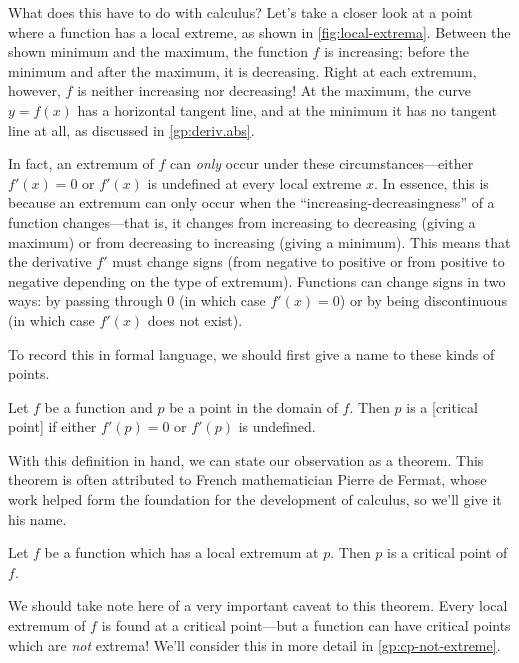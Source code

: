 \documentclass[../book/calcnotes.tex]{subfiles}
\begin{document}
What does this have to do with calculus?
Let's take a closer look at a point where a function has a local extreme, as shown in \cref{fig:local-extrema}.
Between the shown minimum and the maximum, the function $f$ is increasing; before the minimum and after the maximum, it is decreasing.
Right at each extremum, however, $f$ is neither increasing nor decreasing!
At the maximum, the curve $y = f(x)$ has a horizontal tangent line, and at the minimum it has no tangent line at all, as discussed in \cref{gp:deriv.abs}.

In fact, an extremum of $f$ can \emph{only} occur under these circumstances---either $f'(x) = 0$ or $f'(x)$ is undefined at every local extreme $x$.
In essence, this is because an extremum can only occur when the \enquote{increasing-decreasingness} of a function changes---that is, it changes from increasing to decreasing (giving a maximum) or from decreasing to increasing (giving a minimum).
This means that the derivative $f'$ must change signs (from negative to positive or from positive to negative depending on the type of extremum).
Functions can change signs in two ways: by passing through $0$ (in which case $f'(x) = 0$) or by being discontinuous (in which case $f'(x)$ does not exist).

To record this in formal language, we should first give a name to these kinds of points.

\begin{definition}
  \label{def:critical-points}
  Let $f$ be a function and $p$ be a point in the domain of $f$.
  Then $p$ is a [critical point] if either $f'(p) = 0$ or $f'(p)$ is undefined.
\end{definition}

With this definition in hand, we can state our observation as a theorem.
This theorem is often attributed to French mathematician Pierre de Fermat, whose work helped form the foundation for the development of calculus, so we'll give it his name.

\begin{theorem}
  \label{thm:critical-points}
  Let $f$ be a function which has a local extremum at $p$.
  Then $p$ is a critical point of $f$.
\end{theorem}

We should take note here of a very important caveat to this theorem.
Every local extremum of $f$ is found at a critical point---but a function can have critical points which are \emph{not} extrema!
We'll consider this in more detail in \cref{gp:cp-not-extreme}.
\end{document}
